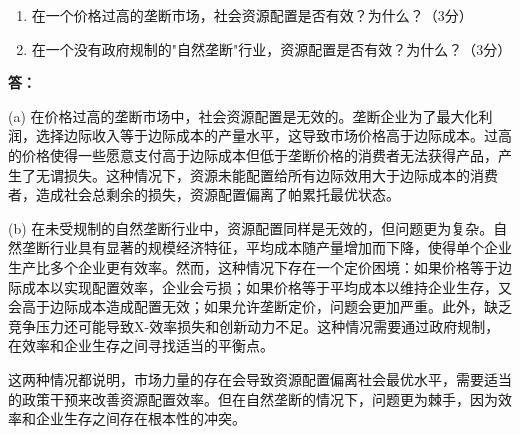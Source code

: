 \documentclass[12pt]{article}
\begin{document}
\begin{enumerate}
\item 在一个价格过高的垄断市场，社会资源配置是否有效？为什么？（3分）
\item 在一个没有政府规制的"自然垄断"行业，资源配置是否有效？为什么？（3分）
\end{enumerate}

\noindent\textbf{答：}

(a) 在价格过高的垄断市场中，社会资源配置是无效的。垄断企业为了最大化利润，选择边际收入等于边际成本的产量水平，这导致市场价格高于边际成本。过高的价格使得一些愿意支付高于边际成本但低于垄断价格的消费者无法获得产品，产生了无谓损失。这种情况下，资源未能配置给所有边际效用大于边际成本的消费者，造成社会总剩余的损失，资源配置偏离了帕累托最优状态。

(b) 在未受规制的自然垄断行业中，资源配置同样是无效的，但问题更为复杂。自然垄断行业具有显著的规模经济特征，平均成本随产量增加而下降，使得单个企业生产比多个企业更有效率。然而，这种情况下存在一个定价困境：如果价格等于边际成本以实现配置效率，企业会亏损；如果价格等于平均成本以维持企业生存，又会高于边际成本造成配置无效；如果允许垄断定价，问题会更加严重。此外，缺乏竞争压力还可能导致X-效率损失和创新动力不足。这种情况需要通过政府规制，在效率和企业生存之间寻找适当的平衡点。

这两种情况都说明，市场力量的存在会导致资源配置偏离社会最优水平，需要适当的政策干预来改善资源配置效率。但在自然垄断的情况下，问题更为棘手，因为效率和企业生存之间存在根本性的冲突。
\end{document}
